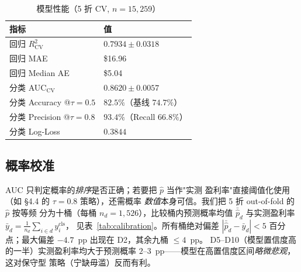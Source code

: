 \documentclass[sigconf,nonacm,10pt]{acmart}
\begin{document}
\begin{table}[h]
  \centering
  \small
  \caption{模型性能（5 折 CV, $n=15{,}259$）}
  \label{tab:model}
  \begin{tabular}{ll}
    \toprule
    \textbf{指标}                    & \textbf{值} \\
    \midrule
    回归 $R^2_{\text{CV}}$          & $0.7934 \pm 0.0318$ \\
    回归 MAE                         & \$16.96 \\
    回归 Median AE                   & \$5.04 \\
    分类 AUC$_{\text{CV}}$          & $0.8620 \pm 0.0057$ \\
    分类 Accuracy @$\tau=0.5$       & $82.5\%$（基线 $74.7\%$）\\
    分类 Precision @$\tau=0.8$      & $93.4\%$（Recall $66.8\%$）\\
    分类 Log-Loss                   & $0.3844$ \\
    \bottomrule
  \end{tabular}
\end{table}

\subsection{概率校准}

AUC 只判定概率的\emph{排序}是否正确；若要把 $\hat p$ 当作"实测
盈利率"直接阈值化使用（如 §4.4 的 $\tau=0.8$ 策略），还需概率
\emph{数值}本身可信。我们把 5 折 out-of-fold 的 $\hat p$ 按等频
分为十桶（每桶 $n_d=1{,}526$），比较桶内预测概率均值
$\bar{\hat p}_d$ 与实测盈利率
$\bar y_d=\tfrac{1}{n_d}\sum_{i\in d} y^{\text{cls}}_i$，
见表~\ref{tab:calibration}。所有桶绝对偏差 $|\bar{\hat p}_d-\bar y_d|<5$
百分点；最大偏差 $-4.7$~pp 出现在 D2，其余九桶 $\leq 4$~pp。
D5--D10（模型置信度高的一半）实测盈利率均大于预测概率
$2$--$3$~pp——模型在高置信度区间\emph{略微悲观}，这对保守型
策略（宁缺毋滥）反而有利。
\end{document}
